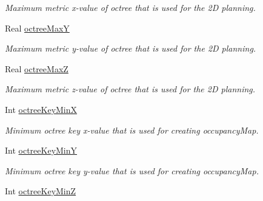\begin{DoxyCompactItemize}
\begin{DoxyCompactList}\small\item\em Maximum metric x-\/value of octree that is used for the 2\-D planning. \end{DoxyCompactList}\item 
\hypertarget{classSquirrelMotionPlanner_1_1Planner_a4cc576a0e7b99895f285f6e385c8454a}{Real \hyperlink{classSquirrelMotionPlanner_1_1Planner_a4cc576a0e7b99895f285f6e385c8454a}{octree\-Max\-Y}}\label{classSquirrelMotionPlanner_1_1Planner_a4cc576a0e7b99895f285f6e385c8454a}

\begin{DoxyCompactList}\small\item\em Maximum metric y-\/value of octree that is used for the 2\-D planning. \end{DoxyCompactList}\item 
\hypertarget{classSquirrelMotionPlanner_1_1Planner_a8926f86a99e6fb47b7188d3cadb9ec9f}{Real \hyperlink{classSquirrelMotionPlanner_1_1Planner_a8926f86a99e6fb47b7188d3cadb9ec9f}{octree\-Max\-Z}}\label{classSquirrelMotionPlanner_1_1Planner_a8926f86a99e6fb47b7188d3cadb9ec9f}

\begin{DoxyCompactList}\small\item\em Maximum metric z-\/value of octree that is used for the 2\-D planning. \end{DoxyCompactList}\item 
\hypertarget{classSquirrelMotionPlanner_1_1Planner_aa56c105ca2caf7f04926787f3f7eb07f}{Int \hyperlink{classSquirrelMotionPlanner_1_1Planner_aa56c105ca2caf7f04926787f3f7eb07f}{octree\-Key\-Min\-X}}\label{classSquirrelMotionPlanner_1_1Planner_aa56c105ca2caf7f04926787f3f7eb07f}

\begin{DoxyCompactList}\small\item\em Minimum octree key x-\/value that is used for creating occupancy\-Map. \end{DoxyCompactList}\item 
\hypertarget{classSquirrelMotionPlanner_1_1Planner_a35360139defeedf1801a8dcdfdba2e36}{Int \hyperlink{classSquirrelMotionPlanner_1_1Planner_a35360139defeedf1801a8dcdfdba2e36}{octree\-Key\-Min\-Y}}\label{classSquirrelMotionPlanner_1_1Planner_a35360139defeedf1801a8dcdfdba2e36}

\begin{DoxyCompactList}\small\item\em Minimum octree key y-\/value that is used for creating occupancy\-Map. \end{DoxyCompactList}\item 
\hypertarget{classSquirrelMotionPlanner_1_1Planner_a86a65b641d51d58afafe9035f56bdc34}{Int \hyperlink{classSquirrelMotionPlanner_1_1Planner_a86a65b641d51d58afafe9035f56bdc34}{octree\-Key\-Min\-Z}}\label{classSquirrelMotionPlanner_1_1Planner_a86a65b641d51d58afafe9035f56bdc34}


\end{DoxyCompactItemize}
